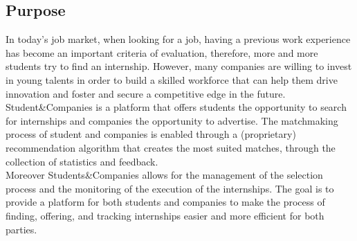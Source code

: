 



\subsection{Purpose}
    In today's job market, when looking for a job, having a previous work experience has become an important criteria of evaluation, therefore, more and more students try to find an internship. However, many companies are willing to invest in young talents in order to build a skilled workforce that can help them drive innovation and foster and secure a competitive edge in the future. \\
    Student\&Companies is a platform that offers students the opportunity to search for internships and companies the opportunity to advertise. The matchmaking process of student and companies is enabled through a (proprietary) recommendation algorithm that creates the most suited matches, through the collection of statistics and feedback. \\
    Moreover Students\&Companies allows for the management of the selection process and the monitoring of the execution of the internships. The goal is to provide a platform for both students and companies to make the process of finding, offering, and tracking internships easier and more efficient for both parties.

